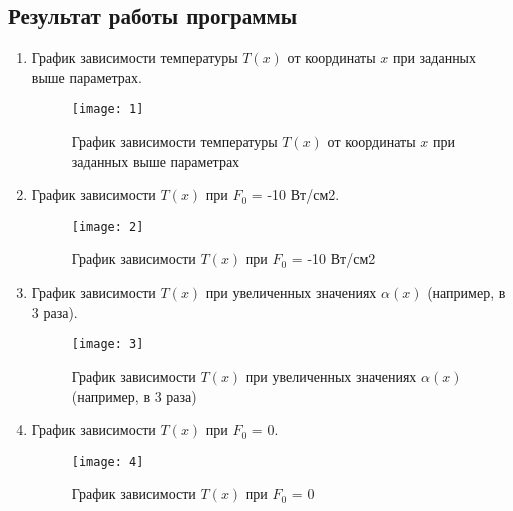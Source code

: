 \documentclass[a4paper, 14pt]{article}
\begin{document}
\subsection*{Результат работы программы}

\begin{enumerate}
  \item График зависимости температуры $T(x)$  от координаты $x$ при заданных выше параметрах.
  
  \begin{figure}[H]
        	\begin{center}
        		\texttt{[image: 1]}
        		\caption{График зависимости температуры $T(x)$  от координаты $x$ при заданных выше параметрах}
        		\label{fig:res1}
        	\end{center}
        \end{figure}
  \newpage
  \item График зависимости $T(x)$ при $F_0$ = -10 Вт/см2.
  
  \begin{figure}[H]
        	\begin{center}
        		\texttt{[image: 2]}
        		\caption{График зависимости $T(x)$ при $F_0$ = -10 Вт/см2}
        		\label{fig:res1}
        	\end{center}
        \end{figure}
        
  \item График зависимости $T(x)$ при увеличенных значениях $\alpha(x)$ (например, в 3 раза). 
  
  \begin{figure}[H]
        	\begin{center}
        		\texttt{[image: 3]}
        		\caption{График зависимости $T(x)$ при увеличенных значениях $\alpha(x)$ (например, в 3 раза)}
        		\label{fig:res1}
        	\end{center}
        \end{figure}
        
   \item График зависимости $T(x)$ при $F_0$ = 0.
   
   \begin{figure}[H]
        	\begin{center}
        		\texttt{[image: 4]}
        		\caption{График зависимости $T(x)$ при $F_0$ = 0}
        		\label{fig:res1}
        	\end{center}
        \end{figure}
        
\end{enumerate}
\end{document}
